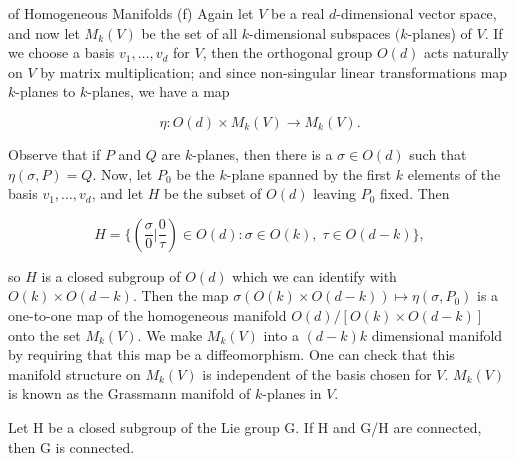 \begin{examples}{of Homogeneous Manifolds}
(f) Again let $V$ be a real $d$-dimensional vector space, and now let $M_{k}(V)$ be the set of all $k$-dimensional subspaces $(k$-planes) of $V$. If we choose a basis $v_{1}, \ldots, v_{d}$ for $V$, then the orthogonal group $O(d)$ acts naturally on $V$ by matrix multiplication; and since non-singular linear transformations map $k$-planes to $k$-planes, we have a map

\begin{equation}
\tag{23}\label{eq:3.65:23}
\eta\colon O(d)\times M_{k}(V)\to M_{k}(V).
\end{equation}

Observe that if $P$ and $Q$ are $k$-planes, then there is a $\sigma \in O(d)$ such that $\eta(\sigma,P) = Q$. Now, let $P_0$ be the $k$-plane spanned by the first $k$ elements of the basis $v_1, \ldots, v_d$, and let $H$ be the subset of $O(d)$ leaving $P_0$ fixed. Then

\begin{equation}
\tag{24}\label{eq:3.65:24}
H=\Big\{\left(\frac{\sigma}{0}\Big|\frac{0}{\tau}\right)\in O(d)\colon\sigma\in O(k),\;\tau\in O(d-k)\Big\},
\end{equation}

so $H$ is a closed subgroup of $O(d)$ which we can identify with $O(k) \times O(d-k)$. Then the map $\sigma(O(k) \times O(d-k)) \mapsto \eta(\sigma, P_0)$ is a one-to-one map of the homogeneous manifold $O(d)/[O(k) \times O(d-k)]$ onto the set $M_k(V)$. We make $M_k(V)$ into a $(d-k)k$ dimensional manifold by requiring that this map be a diffeomorphism. One can check that this manifold structure on $M_k(V)$ is independent of the basis chosen for $V$. $M_k(V)$ is known as the Grassmann manifold of $k$-planes in $V$. 

\end{examples}

\begin{proposition}\label{thm:3.66}
Let H be a closed subgroup of the Lie group G. If H and G/H are connected, then G is connected.

\end{proposition}

